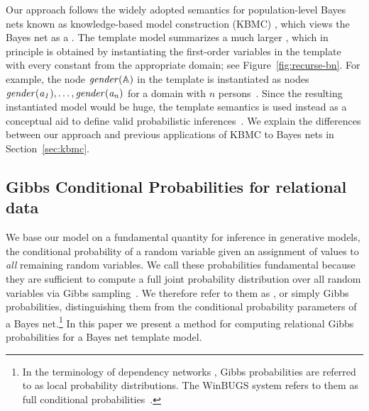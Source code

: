 \documentclass[twoside,11pt]{article}
\begin{document}
Our approach follows the widely adopted semantics for population-level Bayes nets known as knowledge-based model construction (KBMC) \cite{Ngo1997,Koller1997a,Wellman1992}, which views the Bayes net as a . The template model summarizes a much larger , which in principle is obtained by instantiating the first-order variables in the template with every constant from the appropriate domain; see Figure~\ref{fig:recurse-bn}. For example, the node $\it{gender}(\mathbb{A})$ in the template is instantiated as nodes $\it{gender}(a_{1}),\ldots,\it{gender}(a_{n})$ for a domain with $n$ persons~\cite{Neville2007,Getoor2007c,Poole2003,Taskar2002,Domingos2009}. Since the resulting instantiated model would be huge, the template semantics is used instead as a conceptual aid to define valid probabilistic inferences~\cite{getoor-intro}.  
We explain the differences between our approach and previous applications of KBMC to Bayes nets in Section~\ref{sec:kbmc}. 



%
\subsection{Gibbs Conditional Probabilities for relational data}  We base our model on a fundamental quantity for inference in generative models, the conditional probability of a random variable given an assignment of values to {\em all} remaining random variables. We call these probabilities fundamental because they are sufficient to compute a full joint probability distribution over all random variables via Gibbs sampling~\cite{Heckerman2000,Natarajan2012,Lowd2012}.
We therefore refer to them as , or simply Gibbs probabilities, distinguishing them from the conditional probability parameters of a Bayes net.\footnote{In the terminology of dependency networks \cite{Heckerman2000},  Gibbs  probabilities are referred to as local probability distributions. The WinBUGS system refers to them as full conditional probabilities~\cite{Lunn2000}.} In this paper we present a method for computing relational Gibbs probabilities for a Bayes net template model. 
\end{document}
